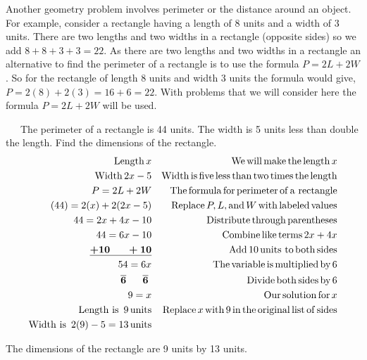  Another geometry problem involves perimeter or the distance around an object.
For example, consider a rectangle having a length of 8 units and a width of 3 units. There
are two lengths and two widths in a rectangle (opposite sides) so we add $8 +
8 + 3 + 3 = 22$. As there are two lengths and two widths in a rectangle an
alternative to find the perimeter of a rectangle is to use the formula $P = 2
L + 2 W$. So for the rectangle of length 8 units and width 3 units the formula would give,
$P = 2 (8) + 2 (3) = 16 + 6 = 22$. With problems that we will consider here
the formula $P = 2 L + 2 W$ will be used.

\begin{example}\label{Lin80}~~~The perimeter of a rectangle is 44 units. The width is 5 units less than double the
  length. Find the dimensions of the rectangle.
  \begin{eqnarray*}
    \tmop{Length} x &  & \tmop{We} \tmop{will} \tmop{make} \tmop{the}
    \tmop{length} x\\
    \tmop{Width} 2 x - 5 &  & \tmop{Width} \tmop{is} \tmop{five} \tmop{less}
    \tmop{than} \tmop{two} \tmop{times} \tmop{the} \tmop{length}\\
    P = 2 L + 2 W &  & \tmop{The} \tmop{formula} \tmop{for} \tmop{perimeter}
    \tmop{of} \tmop{a~rectangle}\\
    (44) = 2 (x) + 2 (2 x - 5) &  & \tmop{Replace} P, L, \tmop{and} W
    \tmop{with} \tmop{labeled} \tmop{values}\\
    44 = 2 x + 4 x - 10 &  & \tmop{Distribute} \tmop{through}
    \tmop{parentheses}\\
    44 = 6 x - 10 &  & \tmop{Combine} \tmop{like} \tmop{terms} 2 x + 4 x\\
    \tmmathbf{\underline{+ 10 ~~~~~+ 10}} &  & \tmop{Add} 10 \tmop{units~to} \tmop{both}
    \tmop{sides}\\
    54 = 6 x &  & \tmop{The} \tmop{variable} \tmop{is} \tmop{multiplied}
    \tmop{by} 6\\
    \tmmathbf{\overline{6} ~~~~~ \overline{6}}~ &  & \tmop{Divide} \tmop{both}
    \tmop{sides} \tmop{by} 6\\
    9 = x &  & \tmop{Our} \tmop{solution} \tmop{for} x\\
    \tmop{Length~is~} 9 \tmop{units}&  & \tmop{Replace} x \tmop{with} 9 \tmop{in} \tmop{the}
    \tmop{original} \tmop{list} \tmop{of} \tmop{sides}\\
    \tmop{Width~is~} 2 (9) - 5 = 13 \tmop{units}&  & %
  \end{eqnarray*}
\begin{center}
The dimensions of the rectangle are 9 units by 13 units.
\end{center}
\end{example}

